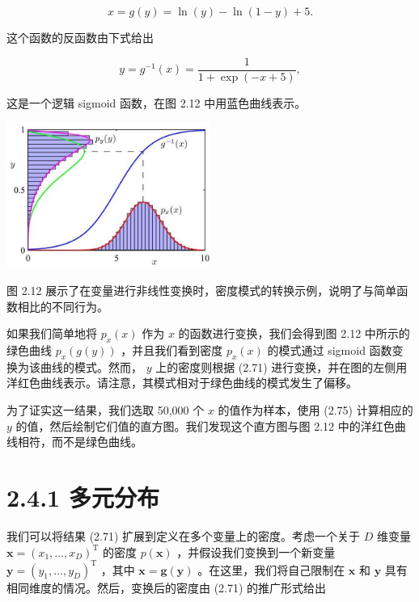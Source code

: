 \documentclass[10pt]{report}
\begin{document}
\[
x = g\left( y\right)  = \ln \left( y\right)  - \ln \left( {1 - y}\right)  + 5. \tag{2.74}
\]

这个函数的反函数由下式给出

\[
y = {g}^{-1}\left( x\right)  = \frac{1}{1 + \exp \left( {-x + 5}\right) }, \tag{2.75}
\]

这是一个逻辑 sigmoid 函数，在图 2.12 中用蓝色曲线表示。

\begin{center}
\includegraphics[max width=0.5\textwidth]{images/0194e279-9b28-703a-88f4-c3ac21e2010d_63_930_349_618_442_0.jpg}
\end{center}
\hspace*{3em} 

图 2.12 展示了在变量进行非线性变换时，密度模式的转换示例，说明了与简单函数相比的不同行为。

如果我们简单地将 \({p}_{x}\left( x\right)\) 作为 \(x\) 的函数进行变换，我们会得到图 2.12 中所示的绿色曲线 \({p}_{x}\left( {g\left( y\right) }\right)\) ，并且我们看到密度 \({p}_{x}\left( x\right)\) 的模式通过 sigmoid 函数变换为该曲线的模式。然而， \(y\) 上的密度则根据 (2.71) 进行变换，并在图的左侧用洋红色曲线表示。请注意，其模式相对于绿色曲线的模式发生了偏移。

为了证实这一结果，我们选取 50,000 个 \(x\) 的值作为样本，使用 (2.75) 计算相应的 \(y\) 的值，然后绘制它们值的直方图。我们发现这个直方图与图 2.12 中的洋红色曲线相符，而不是绿色曲线。

\section*{2.4.1 多元分布}

我们可以将结果 (2.71) 扩展到定义在多个变量上的密度。考虑一个关于 \(D\) 维变量 \(\mathbf{x} = {\left( {x}_{1},\ldots ,{x}_{D}\right) }^{\mathrm{T}}\) 的密度 \(p\left( \mathbf{x}\right)\) ，并假设我们变换到一个新变量 \(\mathbf{y} = {\left( {y}_{1},\ldots ,{y}_{D}\right) }^{\mathrm{T}}\) ，其中 \(\mathbf{x} = \mathbf{g}\left( \mathbf{y}\right)\) 。在这里，我们将自己限制在 \(\mathbf{x}\) 和 \(\mathbf{y}\) 具有相同维度的情况。然后，变换后的密度由 (2.71) 的推广形式给出
\end{document}
